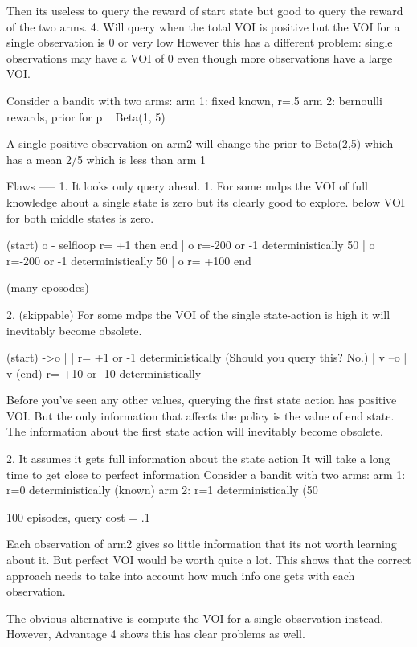 {    Then its useless to query the reward of start state but good to query the reward of the two arms.
4. Will query when the total VOI is positive but the VOI for a single observation is 0 or very low
      However this has a different problem: single observations may have a VOI of 0 even though more observations have a large VOI.

      Consider a bandit with two arms:
        arm 1: fixed known, r=.5 
        arm 2: bernoulli rewards, prior for p ~ Beta(1, 5)

      A single positive observation on arm2 will change the prior to Beta(2,5) which has a mean 2/5 which is less than arm 1


Flaws
-----
1. It looks only query ahead. 
  1. For some mdps the VOI of full knowledge about a single state is zero but its clearly good to explore.
  below VOI for both middle states is zero.  

  (start)
    o - selfloop r= +1 then end 
    |
    o r=-200 or -1 deterministically 50%
    |
    o r=-200 or -1 deterministically 50%
    | 
    o r= +100 end

    (many eposodes)

  2. (skippable) For some mdps the VOI of the single state-action is high it will inevitably become obsolete.

  (start)
  ->o
  | | r= +1 or -1 deterministically (Should you query this? No.)
  | v
  --o
    |
    v
   (end) r= +10 or -10 deterministically 

   Before you've seen any other values, querying the first state action has positive VOI. But the only information that affects the policy is the value of end state. The information about the first state action will inevitably become obsolete.
    
2. It assumes it gets full information about the state action
    It will take a long time to get close to perfect information
      Consider a bandit with two arms: 
        arm 1: r=0 deterministically (known) 
        arm 2: r=1 deterministically (50%
        
      100 episodes, 
      query cost = .1

      Each observation of arm2 gives so little information that its not worth learning about it. But perfect VOI would be worth quite a lot.
      This shows that the correct approach needs to take into account how much info one gets with each observation.

      The obvious alternative is compute the VOI for a single observation instead. However, Advantage 4 shows this has clear problems as well.


}
